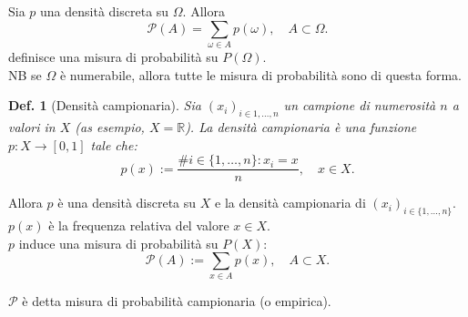 \documentclass{article}
\newtheorem{definition}{Def.}[section]
\begin{document}
Sia $p$ una densità discreta su $\Omega$. Allora
\begin{equation}
	\mathcal{P}(A) = \sum_{\omega \in A} p(\omega), \quad A \subset \Omega.
\end{equation}
definisce una misura di probabilità su $P(\Omega)$.\\
NB se $\Omega$ è numerabile, allora tutte le misura di probabilità sono di
questa forma.

\begin{definition}[Densità campionaria] Sia $(x_i)_{i \in {1, \dots, n}}$ un
campione di numerosità $n$ a valori in $X$ (as esempio, $X = \mathbb{R}$).
La densità campionaria è una funzione $p: X \to [0, 1]$ tale che:
\begin{equation}
	p(x) := \frac{\#i \in \{1, \dots, n\} : x_i = x}{n}, \quad x \in X.
\end{equation}
\end{definition}

Allora $p$ è una densità discreta su $X$ e la densità campionaria di $(x_i)_
{i \in \{1, \dots, n\}}$.\\
$p(x)$ è la frequenza relativa del valore $x \in X$.\\
$p$ induce una misura di probabilità su $P(X)$:
\begin{equation}
	\mathcal{P}(A) := \sum_{x \in A} p(x), \quad A \subset X.
\end{equation}

$\mathcal{P}$ è detta misura di probabilità campionaria (o empirica).
\end{document}
